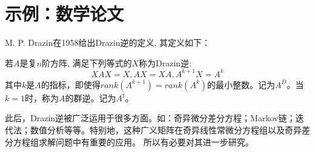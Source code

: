 
\chapter{示例：数学论文}
M. P. Drazin在1958给出Drazin逆的定义, 其定义如下：\par
若$A$是复$n$阶方阵, 满足下列等式的$X$称为Drazin逆:
\begin{equation}
\label{equ:xax}
XAX=X,AX=XA,A^{k+1}X=A^k
\end{equation}
其中$k$是$A$的指标，即使得$rank(A^{k+1})=rank(A^k)$的最小整数。记为$A^D$。当$k=1$时，称为$A$的群逆。记为$A^\sharp$。\par
此后，Drazin逆被广泛运用于很多方面。如：奇异微分差分方程；Markov链；迭代法；数值分析等等。特别地，这种广义矩阵在奇异线性常微分方程组以及奇异差分方程组求解问题中有重要的应用。 所以有必要对其进一步研究。
